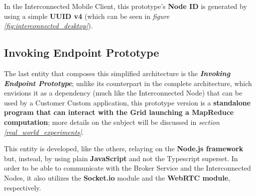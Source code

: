 In the Interconnected Mobile Client, this prototype's \textbf{Node ID} is generated by using a simple \textbf{UUID v4} (which can be seen in \textit{figure \ref{fig:interconnected_desktop}}).

\subsection{Invoking Endpoint Prototype}
The last entity that composes this simplified architecture is the \textbf{\textit{Invoking Endpoint Prototype}}; unlike its counterpart in the complete architecture, which envisions it as a dependency (much like the Interconnected Node) that can be used by a Customer Custom application, this prototype version is a \textbf{standalone program that can interact with the Grid launching a MapReduce computation}; more details on the subject will be discussed in \textit{section \ref{real_world_experiments}}.

This entity is developed, like the others, relaying on the \textbf{Node.js framework} but, instead, by using plain \textbf{JavaScript} and not the Typescript superset. In order to be able to communicate with the Broker Service and the Interconnected Nodes, it also utilizes the \textbf{Socket.io} module and the \textbf{WebRTC module}, respectively.